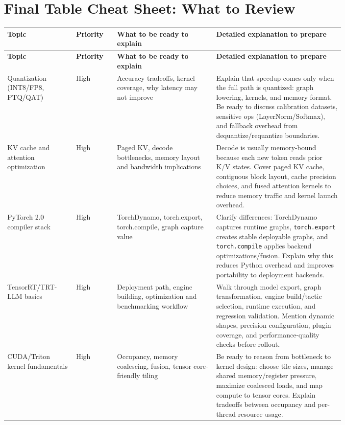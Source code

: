 \documentclass[11pt]{article}
\begin{document}
\section{Final Table Cheat Sheet: What to Review}
\begin{longtable}{|p{0.16\linewidth}|p{0.09\linewidth}|p{0.24\linewidth}|p{0.31\linewidth}|}
\hline
\textbf{Topic} & \textbf{Priority} & \textbf{What to be ready to explain} & \textbf{Detailed explanation to prepare} \\
\hline
\endfirsthead
\hline
\textbf{Topic} & \textbf{Priority} & \textbf{What to be ready to explain} & \textbf{Detailed explanation to prepare} \\
\hline
\endhead
\hline
\endfoot
\hline
\endlastfoot
Quantization (INT8/FP8, PTQ/QAT) & High & Accuracy tradeoffs, kernel coverage, why latency may not improve & Explain that speedup comes only when the full path is quantized: graph lowering, kernels, and memory format. Be ready to discuss calibration datasets, sensitive ops (LayerNorm/Softmax), and fallback overhead from dequantize/requantize boundaries. \\
\hline
KV cache and attention optimization & High & Paged KV, decode bottlenecks, memory layout and bandwidth implications & Decode is usually memory-bound because each new token reads prior K/V states. Cover paged KV cache, contiguous block layout, cache precision choices, and fused attention kernels to reduce memory traffic and kernel launch overhead. \\
\hline
PyTorch 2.0 compiler stack & High & TorchDynamo, torch.export, torch.compile, graph capture value & Clarify differences: TorchDynamo captures runtime graphs, \texttt{torch.export} creates stable deployable graphs, and \texttt{torch.compile} applies backend optimizations/fusion. Explain why this reduces Python overhead and improves portability to deployment backends. \\
\hline
TensorRT/TRT-LLM basics & High & Deployment path, engine building, optimization and benchmarking workflow & Walk through model export, graph transformation, engine build/tactic selection, runtime execution, and regression validation. Mention dynamic shapes, precision configuration, plugin coverage, and performance-quality checks before rollout. \\
\hline
CUDA/Triton kernel fundamentals & High & Occupancy, memory coalescing, fusion, tensor core-friendly tiling & Be ready to reason from bottleneck to kernel design: choose tile sizes, manage shared memory/register pressure, maximize coalesced loads, and map compute to tensor cores. Explain tradeoffs between occupancy and per-thread resource usage. \\

\end{longtable}
\end{document}
